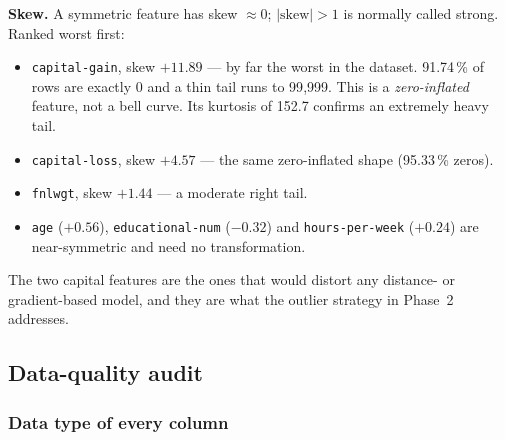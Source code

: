 \documentclass[11pt,a4paper]{article}
\newcommand{\code}[1]{\texttt{\small #1}}
\begin{document}
\textbf{Skew.} A symmetric feature has skew $\approx 0$; $|\text{skew}|>1$ is normally
called strong. Ranked worst first:

\begin{itemize}
  \item \code{capital-gain}, skew $\mathbf{+11.89}$ --- by far the worst in the dataset.
        91.74\,\% of rows are exactly $0$ and a thin tail runs to 99{,}999. This is a
        \emph{zero-inflated} feature, not a bell curve. Its kurtosis of 152.7 confirms an
        extremely heavy tail.
  \item \code{capital-loss}, skew $\mathbf{+4.57}$ --- the same zero-inflated shape
        (95.33\,\% zeros).
  \item \code{fnlwgt}, skew $+1.44$ --- a moderate right tail.
  \item \code{age} ($+0.56$), \code{educational-num} ($-0.32$) and \code{hours-per-week}
        ($+0.24$) are near-symmetric and need no transformation.
\end{itemize}

\noindent
The two capital features are the ones that would distort any distance- or gradient-based
model, and they are what the outlier strategy in Phase~2 addresses.

\subsection{Data-quality audit}

\subsubsection*{Data type of every column}
\end{document}
